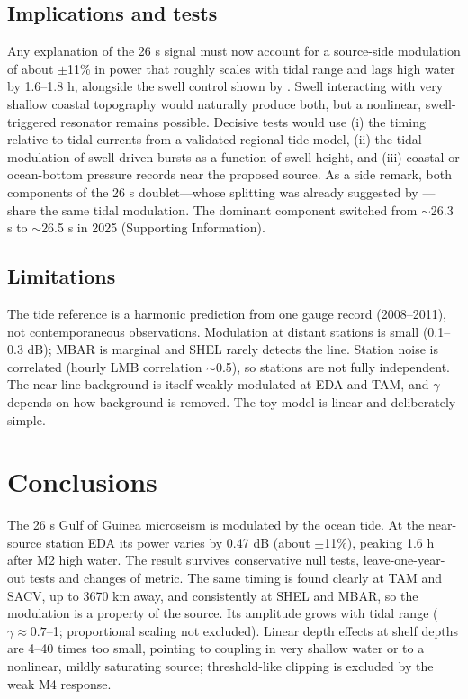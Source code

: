 \documentclass[11pt]{article}
\begin{document}
\subsection{Implications and tests}
Any explanation of the 26 s signal must now account for a source-side modulation of about $\pm$11\% in power that roughly scales with tidal range and lags high water by 1.6--1.8 h, alongside the swell control shown by \citet{poli2026}. Swell interacting with very shallow coastal topography would naturally produce both, but a nonlinear, swell-triggered resonator remains possible. Decisive tests would use (i) the timing relative to tidal currents from a validated regional tide model, (ii) the tidal modulation of swell-driven bursts as a function of swell height, and (iii) coastal or ocean-bottom pressure records near the proposed source. As a side remark, both components of the 26 s doublet---whose splitting was already suggested by \citet{holcomb1998}---share the same tidal modulation. The dominant component switched from $\sim$26.3 s to $\sim$26.5 s in 2025 (Supporting Information).

\subsection{Limitations}
The tide reference is a harmonic prediction from one gauge record (2008--2011), not contemporaneous observations. Modulation at distant stations is small (0.1--0.3 dB); MBAR is marginal and SHEL rarely detects the line. Station noise is correlated (hourly LMB correlation $\sim$0.5), so stations are not fully independent. The near-line background is itself weakly modulated at EDA and TAM, and $\gamma$ depends on how background is removed. The toy model is linear and deliberately simple.

\section{Conclusions}
The 26 s Gulf of Guinea microseism is modulated by the ocean tide. At the near-source station EDA its power varies by 0.47 dB (about $\pm$11\%), peaking 1.6 h after M2 high water. The result survives conservative null tests, leave-one-year-out tests and changes of metric. The same timing is found clearly at TAM and SACV, up to 3670 km away, and consistently at SHEL and MBAR, so the modulation is a property of the source. Its amplitude grows with tidal range ($\gamma\approx0.7$--1; proportional scaling not excluded). Linear depth effects at shelf depths are 4--40 times too small, pointing to coupling in very shallow water or to a nonlinear, mildly saturating source; threshold-like clipping is excluded by the weak M4 response.
\end{document}
